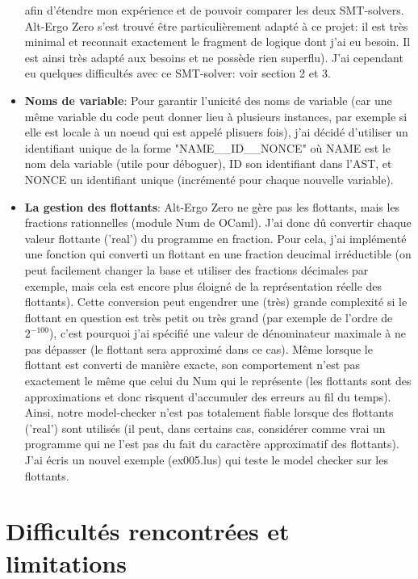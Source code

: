 \documentclass[a4paper]{article}%
\begin{document}
\begin{itemize}
		afin d'étendre mon expérience et de pouvoir comparer les deux SMT-solvers. Alt-Ergo Zero s'est trouvé être particulièrement adapté à ce projet:
		il est très minimal et reconnait exactement le fragment de logique dont j'ai eu besoin. Il est ainsi très adapté aux besoins et ne possède rien superflu).
		J'ai cependant eu quelques difficultés avec ce SMT-solver: voir section 2 et 3.\\
		\item \textbf{Noms de variable}: Pour garantir l'unicité des noms de variable (car une même variable du code peut donner lieu à plusieurs instances,
		par exemple si elle est locale à un noeud qui est appelé plisuers fois), j'ai décidé d'utiliser un identifiant unique de la forme "NAME\_\_ID\_\_NONCE"
		où NAME est le nom dela variable (utile pour déboguer), ID son identifiant dans l'AST, et NONCE un identifiant unique (incrémenté pour chaque nouvelle variable).\\
		\item \textbf{La gestion des flottants}: Alt-Ergo Zero ne gère pas les flottants, mais les fractions rationnelles (module Num de OCaml).
		J'ai donc dû convertir chaque valeur flottante ('real') du programme en fraction. Pour cela, j'ai implémenté une fonction qui converti un flottant en une fraction
		deucimal irréductible (on peut facilement changer la base et utiliser des fractions décimales par exemple, mais cela est encore plus éloigné de la représentation réelle des flottants).
		Cette conversion peut engendrer une (très) grande complexité si le flottant en question est très petit ou très grand (par exemple de l'ordre de $2^{-100}$),
		c'est pourquoi j'ai spécifié une valeur de dénominateur maximale à ne pas dépasser (le flottant sera approximé dans ce cas).
		Même lorsque le flottant est converti de manière exacte, son comportement n'est pas exactement le même que celui du Num qui le représente
		(les flottants sont des approximations et donc risquent d'accumuler des erreurs au fil du temps).
		Ainsi, notre model-checker n'est pas totalement fiable lorsque des flottants ('real') sont utilisés (il peut, dans certains cas, considérer comme vrai
		un programme qui ne l'est pas du fait du caractère approximatif des flottants). J'ai écris un nouvel exemple (ex005.lus) qui teste le model checker sur les flottants.
	\end{itemize}

	\section{Difficultés rencontrées et limitations}
\end{document}
